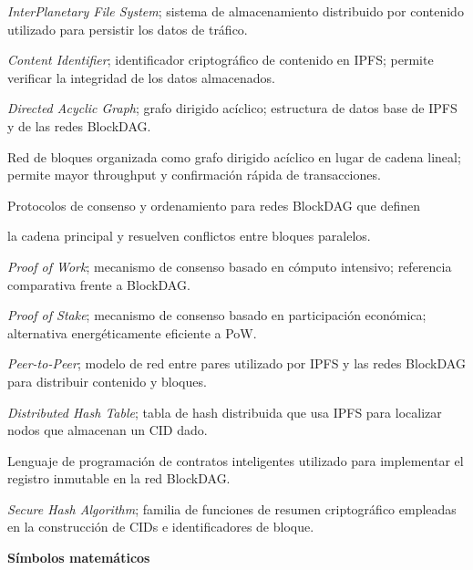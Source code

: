 \begin{description}[leftmargin=3cm, style=sameline, font=\normalfont]
  \item[IPFS]      \textit{InterPlanetary File System}; sistema de almacenamiento distribuido
                   por contenido utilizado para persistir los datos de tráfico.
  \item[CID]       \textit{Content Identifier}; identificador criptográfico de contenido en
                   IPFS; permite verificar la integridad de los datos almacenados.
  \item[DAG]       \textit{Directed Acyclic Graph}; grafo dirigido acíclico; estructura de
                   datos base de IPFS y de las redes BlockDAG.
  \item[BlockDAG]  Red de bloques organizada como grafo dirigido acíclico en lugar de cadena
                   lineal; permite mayor throughput y confirmación rápida de transacciones.
  \item[PHANTOM /] Protocolos de consenso y ordenamiento para redes BlockDAG que definen
  \item[GHOSTDAG]  la cadena principal y resuelven conflictos entre bloques paralelos.
  \item[PoW]       \textit{Proof of Work}; mecanismo de consenso basado en cómputo
                   intensivo; referencia comparativa frente a BlockDAG.
  \item[PoS]       \textit{Proof of Stake}; mecanismo de consenso basado en participación
                   económica; alternativa energéticamente eficiente a PoW.
  \item[P2P]       \textit{Peer-to-Peer}; modelo de red entre pares utilizado por IPFS y las
                   redes BlockDAG para distribuir contenido y bloques.
  \item[DHT]       \textit{Distributed Hash Table}; tabla de hash distribuida que usa IPFS
                   para localizar nodos que almacenan un CID dado.
  \item[Solidity]  Lenguaje de programación de contratos inteligentes utilizado para
                   implementar el registro inmutable en la red BlockDAG.
  \item[SHA]       \textit{Secure Hash Algorithm}; familia de funciones de resumen
                   criptográfico empleadas en la construcción de CIDs e identificadores de
                   bloque.
\end{description}

\vspace{0.8cm}
\noindent\textbf{Símbolos matemáticos}

